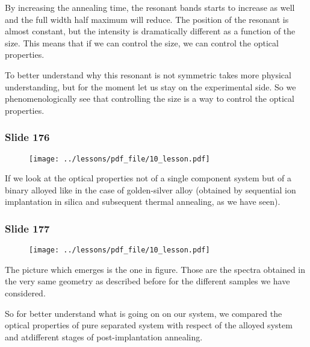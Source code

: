 \documentclass[../main/main.tex]{subfiles}
\begin{document}
By increasing the annealing time, the resonant bands starts to increase as well and the full width half maximum will reduce.
The position of the resonant is almost constant, but the intensity is dramatically different as a function of the size.
This means that if we can control the size, we can control the optical properties.

To better understand why this resonant is not symmetric takes more physical understanding, but for the moment let us stay on the experimental side.
So we phenomenologically see that controlling the size is a way to control the optical properties.

\newpage

\subsubsection{Slide 176}

\begin{figure}[h!]
\centering
\texttt{[image: ../lessons/pdf\_file/10\_lesson.pdf]}
\end{figure}

If we look at the optical properties not of a single component system but of a binary alloyed like in the case of golden-silver alloy (obtained by sequential ion implantation in silica and subsequent thermal annealing, as we have seen).

\newpage

\subsubsection{Slide 177}

\begin{figure}[h!]
\centering
\texttt{[image: ../lessons/pdf\_file/10\_lesson.pdf]}
\end{figure}

The picture which emerges is the one in figure. Those are the spectra obtained in the very same geometry as described before for the different samples we have considered.

So for better understand what is going on on our system, we compared the optical properties of pure separated system with respect of the alloyed system and atdifferent stages of post-implantation annealing.
\end{document}
